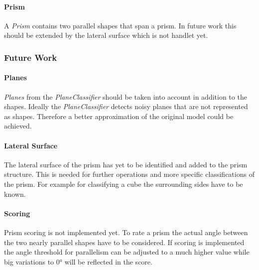 \documentclass[../ClassicThesis.tex]{subfiles}
\begin{document}
\paragraph{Prism}

A \emph{Prism} contains two parallel shapes that span a prism. In future work this should be extended by the lateral surface which is not handlet yet.

\subsubsection{Future Work}
\label{sec:PrismFutureWork}

\paragraph{Planes} \emph{Planes} from the \emph{PlaneClassifier} should be taken into account in addition to the shapes. Ideally the \emph{PlaneClassifier} detects noisy planes that are not represented as shapes. Therefore a better approximation of the original model could be achieved.

\paragraph{Lateral Surface} The lateral surface of the prism has yet to be identified and added to the prism structure. This is needed for further operations and more specific classifications of the prism. For example for classifying a cube the surrounding sides have to be known.

\paragraph{Scoring} Prism scoring is not implemented yet. To rate a prism the actual angle between the two nearly parallel shapes have to be considered. If scoring is implemented the angle threshold for parallelism can be adjusted to a much higher value while big variations to 0° will be reflected in the score.
\end{document}
